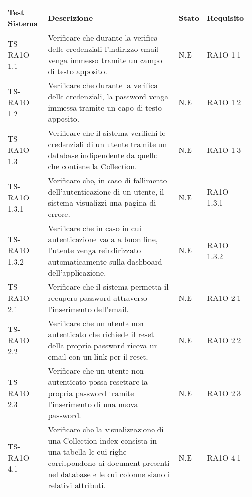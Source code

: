 

	\begin{center}
	\def\arraystretch{1.5}
	\bgroup
		\begin{longtable}{| p{3cm} | p{6cm} | p{1.5cm} | p{2cm} | }
		\hline 
		 \textbf{Test Sistema} & \textbf{Descrizione} & \textbf{Stato} & \textbf{Requisito} \\ \hline
				TS-RA1O 1.1 & 
				Verificare che durante la verifica delle credenziali l'indirizzo email venga immesso tramite un campo di testo apposito. & N.E & RA1O 1.1 \newline  \\ \hline 
				TS-RA1O 1.2 & 
				Verificare che durante la verifica delle credenziali, la password venga immessa tramite un capo di testo apposito.
 & N.E & RA1O 1.2 \newline  \\ \hline 
				TS-RA1O 1.3 & 
				Verificare che il sistema verifichi le credenziali di un utente tramite un database indipendente da quello che contiene la Collection. & N.E & RA1O 1.3 \newline  \\ \hline 
				TS-RA1O 1.3.1 & 
				Verificare che, in caso di fallimento dell'autenticazione di un utente, il sistema visualizzi una pagina di errore. & N.E & RA1O 1.3.1 \newline  \\ \hline 
				TS-RA1O 1.3.2 & 
				Verificare che in caso in cui autenticazione vada a buon fine, l'utente venga reindirizzato automaticamente sulla dashboard dell'applicazione.  & N.E & RA1O 1.3.2 \newline  \\ \hline 
				TS-RA1O 2.1 & 
				Verificare che il sistema permetta il recupero password attraverso l'inserimento dell'email.
 & N.E & RA1O 2.1 \newline  \\ \hline 
				TS-RA1O 2.2 & 
				Verificare che un utente non autenticato che richiede il reset della propria password riceva un email con un link per il reset. & N.E & RA1O 2.2 \newline  \\ \hline 
				TS-RA1O 2.3 & 
				Verificare che un utente non autenticato possa resettare la propria password tramite l'inserimento di una nuova password.
 & N.E & RA1O 2.3 \newline  \\ \hline 
				TS-RA1O 4.1 & 
				Verificare che la visualizzazione di una Collection-index consista in una tabella le cui righe corrispondono ai document presenti nel database e le cui colonne siano i relativi attributi. & N.E & RA1O 4.1 \newline  \\ \hline 

\end{longtable}
\end{center}
